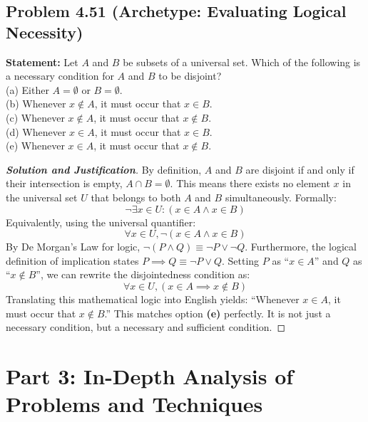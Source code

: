 \documentclass[11pt]{article}
\begin{document}
\subsection{Problem 4.51 (Archetype: Evaluating Logical Necessity)}
\textbf{Statement:} Let $A$ and $B$ be subsets of a universal set. Which of the following is a necessary condition for $A$ and $B$ to be disjoint? \\
(a) Either $A = \emptyset$ or $B = \emptyset$. \\
(b) Whenever $x \notin A$, it must occur that $x \in B$. \\
(c) Whenever $x \notin A$, it must occur that $x \notin B$. \\
(d) Whenever $x \in A$, it must occur that $x \in B$. \\
(e) Whenever $x \in A$, it must occur that $x \notin B$.

\begin{proof}[\textbf{Solution and Justification}]
By definition, $A$ and $B$ are disjoint if and only if their intersection is empty, $A \cap B = \emptyset$. This means there exists no element $x$ in the universal set $U$ that belongs to both $A$ and $B$ simultaneously. Formally:
\[ \neg \exists x \in U : (x \in A \land x \in B) \]
Equivalently, using the universal quantifier:
\[ \forall x \in U, \neg(x \in A \land x \in B) \]
By De Morgan's Law for logic, $\neg(P \land Q) \equiv \neg P \lor \neg Q$. Furthermore, the logical definition of implication states $P \implies Q \equiv \neg P \lor Q$. Setting $P$ as ``$x \in A$'' and $Q$ as ``$x \notin B$'', we can rewrite the disjointedness condition as:
\[ \forall x \in U, (x \in A \implies x \notin B) \]
Translating this mathematical logic into English yields: ``Whenever $x \in A$, it must occur that $x \notin B$.''
This matches option \textbf{(e)} perfectly. It is not just a necessary condition, but a necessary and sufficient condition.
\end{proof}

\section{Part 3: In-Depth Analysis of Problems and Techniques}
\end{document}
